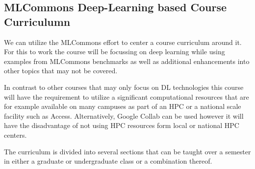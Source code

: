 \documentclass[utf8]{FrontiersinVancouver} %
\begin{document}
\subsection{MLCommons Deep-Learning based Course Curriculumn}

We can utilize the MLCommons effort to center a course curriculum
around it. For this to work the course will be focussing on deep
learning while using examples from MLCommons benchmarks as well as
additional enhancements into other topics that may not be covered.

In contrast to other courses that may only focus on DL technologies
this course will have the requirement to utilize a significant
computational resources that are for example available on many
campuses as part of an HPC or a national scale facility such as
Access. Alternatively, Google Collab can be used however it will have
the disadvantage of not using HPC resources form local or national HPC
centers.

The curriculum is divided into several sections that can be taught
over a semester in either a graduate or undergraduate class or a
combination thereof.
\end{document}
